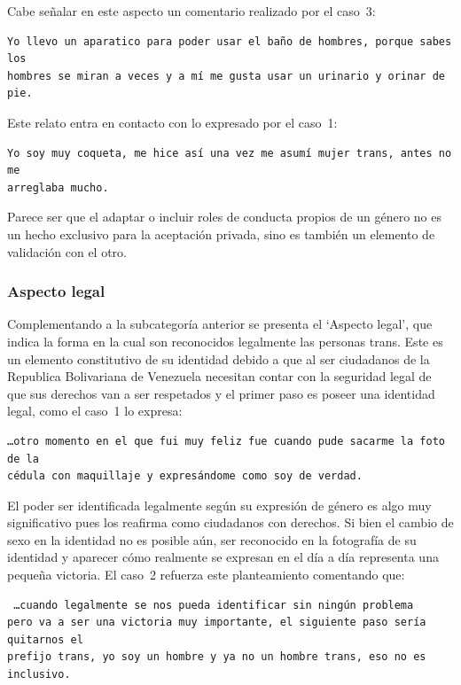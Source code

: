Cabe señalar en este aspecto un comentario realizado por el caso~3:

\begin{verbatim}
Yo llevo un aparatico para poder usar el baño de hombres, porque sabes los
hombres se miran a veces y a mí me gusta usar un urinario y orinar de pie.
\end{verbatim}

Este relato entra en contacto con lo expresado por el caso~1:

\begin{verbatim}
Yo soy muy coqueta, me hice así una vez me asumí mujer trans, antes no me
arreglaba mucho.
\end{verbatim}

Parece ser que el adaptar o incluir roles de conducta propios de un género no es
un hecho exclusivo para la aceptación privada, sino es también un elemento
de validación con el otro.

\subsubsection{Aspecto legal}

Complementando a la subcategoría anterior se presenta el ‘Aspecto legal’, que
indica la forma en la cual son reconocidos legalmente las personas trans. Este
es un elemento constitutivo de su identidad debido a que al ser ciudadanos de la
Republica Bolivariana de Venezuela necesitan contar con la seguridad legal de
que sus derechos van a ser respetados y el primer paso es poseer una identidad
legal, como el caso~1 lo expresa:

\begin{verbatim}
…otro momento en el que fui muy feliz fue cuando pude sacarme la foto de la
cédula con maquillaje y expresándome como soy de verdad.
\end{verbatim}

El poder ser identificada legalmente según su expresión de género es algo muy
significativo pues los reafirma como ciudadanos con derechos. Si bien el cambio
de sexo en la identidad no es posible aún, ser reconocido en la fotografía de su
identidad y aparecer cómo realmente se expresan en el día a día representa una
pequeña victoria. El caso~2 refuerza este planteamiento comentando que:

\begin{verbatim} …cuando legalmente se nos pueda identificar sin ningún problema
pero va a ser una victoria muy importante, el siguiente paso sería quitarnos el
prefijo trans, yo soy un hombre y ya no un hombre trans, eso no es inclusivo.
\end{verbatim} %

